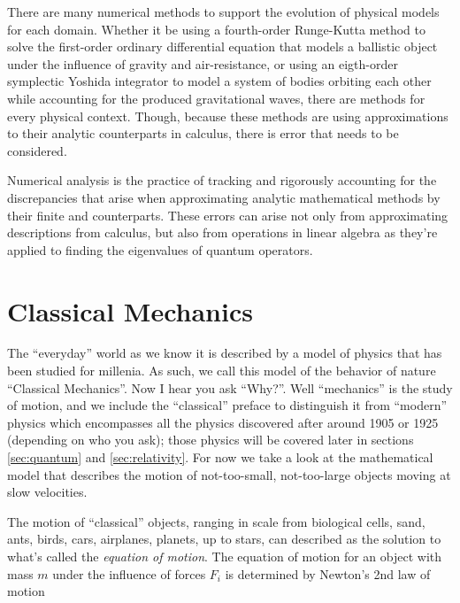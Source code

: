 \documentclass{report}
\begin{document}
    There are many numerical methods to support the evolution of physical models for each domain.  Whether it be using a fourth-order Runge-Kutta method to solve the first-order ordinary differential equation  that models a ballistic object under the influence of gravity and air-resistance, or using an eigth-order symplectic Yoshida integrator to model a system of bodies orbiting each other while accounting for the produced gravitational waves, there are methods for every physical context.  Though, because these methods are using approximations to their analytic counterparts in calculus, there is error that needs to be considered.

    Numerical analysis is the practice of tracking and rigorously accounting for the discrepancies that arise when approximating analytic mathematical methods by their finite and counterparts.  These errors can arise not only from approximating descriptions from calculus, but also from operations in linear algebra as they're applied to finding the eigenvalues of quantum operators.

\chapter{Classical Mechanics} \label{sec:classical}

    The ``everyday'' world as we know it is described by a model of physics that has been studied for millenia.  As such, we call this model of the behavior of nature ``Classical Mechanics''.  Now I hear you ask ``Why?''.  Well ``mechanics'' is the study of motion, and we include the ``classical'' preface to distinguish it from ``modern'' physics which encompasses all the physics discovered after around 1905 or 1925 (depending on who you ask); those physics will be covered later in sections \ref{sec:quantum} and \ref{sec:relativity}.  For now we take a look at the mathematical model that describes the motion of not-too-small, not-too-large objects moving at slow velocities.
    
    The motion of ``classical'' objects, ranging in scale from biological cells, sand, ants, birds, cars, airplanes, planets, up to stars, can described as the solution to what's called the \emph{equation of motion}.  The equation of motion for an object with mass $m$ under the influence of forces $F_i$ is determined by Newton's 2nd law of motion
    
\end{document}
